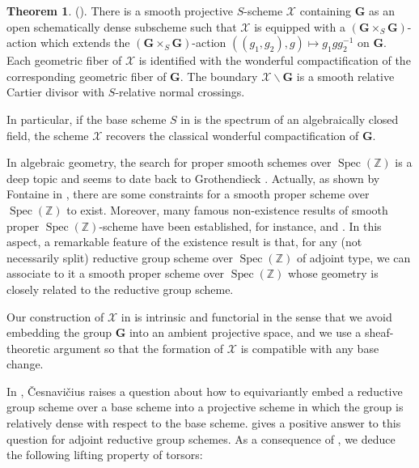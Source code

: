 \documentclass[11pt, reqno]{amsart}
\theoremstyle{plain}
\theoremstyle{definition}
\newtheorem{theorem}{Theorem}[section]
\DeclareMathOperator{\Spec}{Spec}		%
\begin{document}
\begin{theorem}\label{mainresult}
(). There is a smooth projective $S$-scheme $\mathcal{X}$ containing $\mathbf{G}$ as an open schematically dense subscheme such that $\mathcal{X}$ is equipped with a $(\mathbf{G}\times_S\mathbf{G})$-action which extends the $(\mathbf{G}\times_S \mathbf{G})$-action $((g_1,g_2),g)\mapsto g_1gg_2^{-1}$ on $\mathbf{G}$. Each geometric fiber of $\mathcal{X}$ is identified with the wonderful compactification of the corresponding geometric fiber of $\mathbf{G}$. The boundary $\mathcal{X}\backslash \mathbf{G}$ is a smooth relative Cartier divisor with $S$-relative normal crossings.
\end{theorem}

In particular, if the base scheme $S$ in  is the spectrum of an algebraically closed field, the scheme $\mathcal{X}$ recovers the classical wonderful compactification of $\mathbf{G}$. 

In algebraic geometry, the search for proper smooth schemes over $\Spec(\mathbb{Z})$ is a deep topic and seems to date back to Grothendieck \cite[page 242]{Mazurarithmeticoncurves}. Actually, as shown by Fontaine in \cite{Fontainepropersmoothscheme}, there are some constraints for a smooth proper scheme over $\Spec(\mathbb{Z})$ to exist. Moreover, many famous non-existence results of smooth proper $\Spec(\mathbb{Z})$-scheme have been established, for instance, \cite{Fontainethereisnoabelianscheme} and \cite{SchroerthereisnoenriquessurfaceoverZ}. In this aspect, a remarkable feature of the existence result  is that, for any (not necessarily split) reductive group scheme over $\Spec(\mathbb{Z})$ of adjoint type, we can associate to it a smooth proper scheme over $\Spec(\mathbb{Z})$ whose geometry is closely related to the reductive group scheme. 

Our construction of $\mathcal{X}$ in  is intrinsic and functorial in the sense that we avoid embedding the group $\mathbf{G}$ into an ambient projective space, and we use a sheaf-theoretic argument so that the formation of $\mathcal{X}$ is compatible with any base change. 

In \cite[Conjecture 6.2.3]{CKproblemtorsors}, \v{C}esnavi\v{c}ius raises a question about how to equivariantly embed a reductive group scheme over a base scheme into a projective scheme in which the group is relatively dense with respect to the base scheme.  gives a positive answer to this question for adjoint reductive group schemes. As a consequence of , we deduce the following lifting property of torsors:
\end{document}
